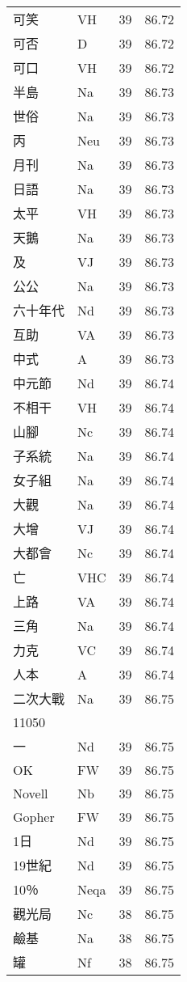 \documentclass[twocolumn]{book}
\begin{document}
\begin{supertabular}{llrr}
可笑 & VH & 39 &  86.72\\
可否 & D & 39 &  86.72\\
可口 & VH & 39 &  86.72\\
半島 & Na & 39 &  86.73\\
世俗 & Na & 39 &  86.73\\
丙 & Neu & 39 &  86.73\\
月刊 & Na & 39 &  86.73\\
日語 & Na & 39 &  86.73\\
太平 & VH & 39 &  86.73\\
天鵝 & Na & 39 &  86.73\\
及 & VJ & 39 &  86.73\\
公公 & Na & 39 &  86.73\\
六十年代 & Nd & 39 &  86.73\\
互助 & VA & 39 &  86.73\\
中式 & A & 39 &  86.73\\
中元節 & Nd & 39 &  86.74\\
不相干 & VH & 39 &  86.74\\
山腳 & Nc & 39 &  86.74\\
子系統 & Na & 39 &  86.74\\
女子組 & Na & 39 &  86.74\\
大觀 & Na & 39 &  86.74\\
大增 & VJ & 39 &  86.74\\
大都會 & Nc & 39 &  86.74\\
亡 & VHC & 39 &  86.74\\
上路 & VA & 39 &  86.74\\
三角 & Na & 39 &  86.74\\
力克 & VC & 39 &  86.74\\
人本 & A & 39 &  86.74\\
二次大戰 & Na & 39 &  86.75\\
11050\\
一 & Nd & 39 &  86.75\\
OK & FW & 39 &  86.75\\
Novell & Nb & 39 &  86.75\\
Gopher & FW & 39 &  86.75\\
1日 & Nd & 39 &  86.75\\
19世紀 & Nd & 39 &  86.75\\
10％ & Neqa & 39 &  86.75\\
觀光局 & Nc & 38 &  86.75\\
鹼基 & Na & 38 &  86.75\\
罐 & Nf & 38 &  86.75\\

\end{supertabular}
\end{document}

